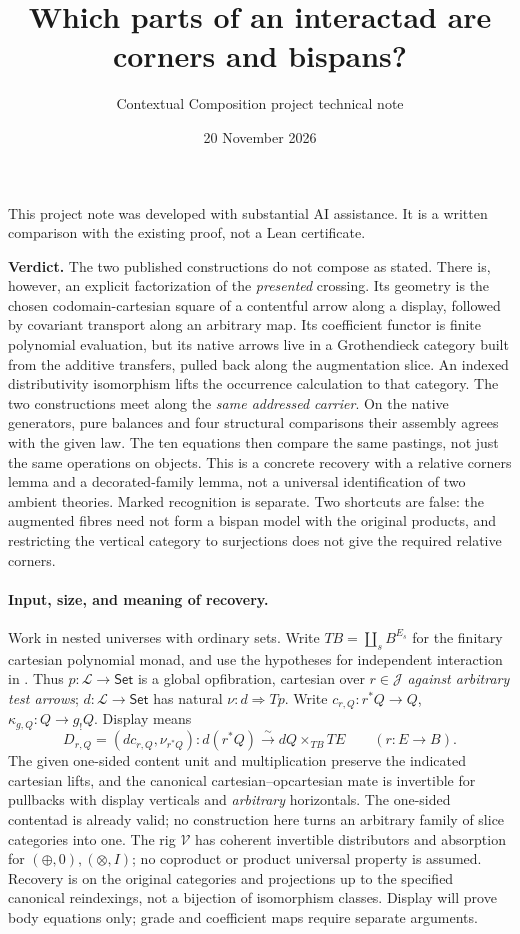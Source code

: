 \documentclass[11pt]{article}
\title{Which parts of an interactad are corners and bispans?}
\author{Contextual Composition project technical note}
\date{20 November 2026}
\theoremstyle{definition}
\newcommand{\Set}{\mathsf{Set}}
\newcommand{\V}{\mathcal V}
\newcommand{\J}{\mathcal J}
\newcommand{\Lcat}{\mathcal L}
\newcommand{\iso}{\xrightarrow{\sim}}
\begin{document}
\maketitle
\noindent This project note was developed with substantial AI assistance.
It is a written comparison with the existing proof, not a Lean certificate.

\noindent\textbf{Verdict.}
The two published constructions do not compose as stated. There is, however,
an explicit factorization of the \emph{presented} crossing. Its geometry is
the chosen codomain-cartesian square of a contentful arrow along a display,
followed by covariant transport along an arbitrary map. Its coefficient
functor is finite polynomial evaluation, but its native arrows live in a
Grothendieck category built from the additive transfers, pulled back along
the augmentation slice. An indexed distributivity isomorphism lifts the
occurrence calculation to that category. The two constructions meet along
the \emph{same addressed carrier}. On the native generators, pure balances
and four structural comparisons their assembly agrees with the given law.
The ten equations then compare the same pastings, not just the same
operations on objects. This is a concrete recovery with a relative
corners lemma and a decorated-family lemma, not a universal
identification of two ambient theories. Marked recognition is separate.
Two shortcuts are false: the augmented fibres need not form a bispan model
with the original products, and restricting the vertical category to
surjections does not give the required relative corners.

\paragraph{Input, size, and meaning of recovery.}
Work in nested universes with ordinary sets. Write
$TB=\coprod_s B^{E_s}$ for the finitary cartesian polynomial monad,
and use the hypotheses for independent interaction in \cite{O1}.
Thus $p:\Lcat\to\Set$ is a global opfibration, cartesian over $r\in\J$
\emph{against arbitrary test arrows}; $d:\Lcat\to\Set$ has natural
$\nu:d\Rightarrow Tp$. Write $c_{r,Q}:r^*Q\to Q$,
$\kappa_{g,Q}:Q\to g_!Q$. Display means
\begin{equation}
 D_{r,Q}=(d c_{r,Q},\nu_{r^*Q}):d(r^*Q)\iso dQ\times_{TB}TE
 \qquad (r:E\to B).
 \label{eq:display}
\end{equation}
The given one-sided content unit and multiplication preserve the indicated
cartesian lifts, and the canonical cartesian--opcartesian mate is invertible
for pullbacks with display verticals and \emph{arbitrary} horizontals.
The one-sided contentad is already valid; no construction here turns an
arbitrary family of slice categories into one. The rig $\V$ has coherent
invertible distributors and absorption for $(\oplus,0),(\otimes,I)$; no
coproduct or product universal property is assumed. Recovery is on the
original categories and projections up to the specified canonical
reindexings, not a bijection of isomorphism classes. Display will prove
body equations only; grade and coefficient maps require separate arguments.
\end{document}
